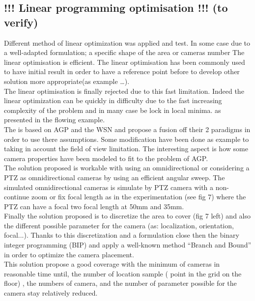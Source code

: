 \subsection{ !!! Linear programming optimisation !!! (to verify)}
	Different method of linear optimization was applied and test. In some case due to a well-adapted formulation; a specific shape of the area or cameras number The linear optimisation is efficient. 
	The linear optimisation has been commonly used to have initial result in order to have a reference point before to develop other solution more appropriate(as example \cite{141*akbarzadeh2013,151*zhao2013,82*chrysostomou2012,33*reddy2012}…).  \\
	 The linear optimisation  is finally rejected due to this fast limitation.  Indeed the linear optimization can be quickly in difficulty due to the fast increasing complexity of the problem and in many case be lock in local minima. as presented in the flowing example.\\

	 
	 
The \cite{43*erdem2006} is based on AGP and the WSN and propose a fusion off their 2 paradigms in order to use there assumptions. Some modification have been done as example to taking in account the field of view limitation. The interesting aspect is how some camera properties have been modeled to fit to the problem of AGP.  \\
The solution proposed is workable with using an omnidirectional or considering a PTZ as omnidirectional cameras by using an efficient angular sweep. The simulated omnidirectional cameras is simulate by PTZ camera with a non-continue zoom or fix focal length as in the  experimentation (see fig 7) where  the PTZ can have a focal two focal length  at 50mm and  35mm. 	 \\
	 

Finally the solution proposed is to discretize the area to cover (fig 7 left) and also the different possible parameter for the camera (as: localization, orientation, focal...). Thanks to this discretization and a formulation close then the binary integer programming (BIP) and apply a well-known method “Branch and Bound” in order to optimize the camera placement.  \\
This solution  propose a  good  coverage with the minimum of cameras  in reasonable time until, the  number of location sample ( point in the grid on the floor) , the numbers of camera, and the number of parameter possible for the camera stay relatively  reduced.  \\
 
